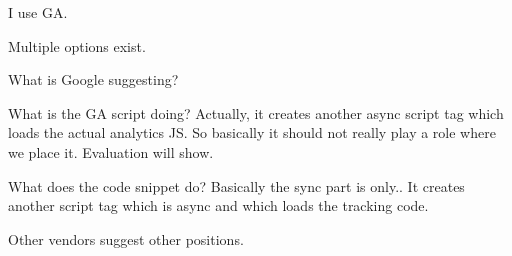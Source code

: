 I use GA.

Multiple options exist.

What is Google suggesting?







What is the GA script doing?
Actually, it creates another async script tag which loads the actual analytics JS.
So basically it should not really play a role where we place it.
Evaluation will show.

What does the code snippet do?
Basically the sync part is only..
It creates another script tag which is async and which loads the tracking code.









Other vendors suggest other positions.







